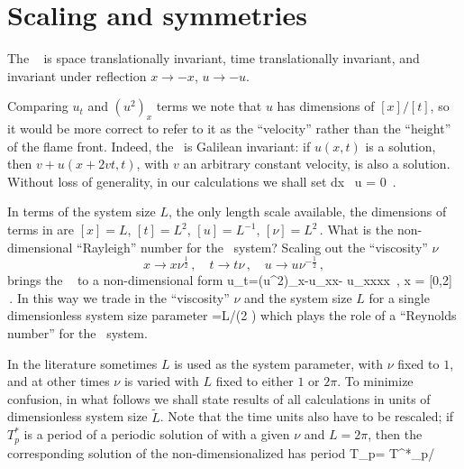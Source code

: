 %

\section{Scaling and symmetries}


The \KSe\  is space translationally invariant,
time translationally invariant, and invariant under
reflection
$x \to -x$, 
$u \to -u$. 

Comparing $u_t$ and $(u^2)_x$ terms we note that $u$ has
dimensions of $[x]/[t]$, so it would be more correct to
refer to it as the ``velocity'' rather than the 
``height'' of the flame front. Indeed, the  \KSe\ is
Galilean invariant: if $u(x,t)$ is a solution, then 
$v+u(x+2vt,t)$, with $v$ an arbitrary constant velocity, is also a solution. 
Without loss of generality, in our calculations we shall set 
\beq
\int dx \, u = 0
\,.

In terms of the system size $L$, the only length scale available,
the dimensions of terms in  are
$ %
[x]=L
$, $%
[t]=L^2
$, $%
[u]=L^{-1}
$, $%
[\nu]=L^2
\,.
$ %
What is the non-dimensional ``Rayleigh'' number for the
\KS\ system? 
 Scaling out the ``viscosity'' $\nu$ 
\[ 
x \to x \nu^{\frac{1}{2}}
\,,\quad
t \to t \nu
\,,\quad
u \to u \nu^{-\frac{1}{2}}
\,,
\]
brings the \KSe\ 
to a non-dimensional form
\beq
u_t=(u^2)_x-u_{xx}- u_{xxxx}
\,,\qquad	
	x \in  [0,L\nu^{-\frac{1}{2}}] = [0,2\pi{}]
\,.
In this way we trade in the ``viscosity'' $\nu$
and the system size $L$ for a single
dimensionless system size parameter
\beq
	={L}/{(2 \pi \sqrt{\nu})}
which plays the role of a ``Reynolds number''
for the \KS\ system.

In the literature sometimes 
$L$ is used as the system parameter, with $\nu$ fixed to $1$, and
at other times $\nu$ is varied with $L$ fixed to either $1$ or $2\pi$.
To minimize confusion,
in what follows we shall state results of all 
calculations in units of dimensionless system size $\tilde{L}$.
Note that the time units also have to be
rescaled; if $T^*_p$ is a period
of a periodic solution of  with a given
$\nu$ and $L=2\pi$, then
the corresponding solution of the non-dimensionalized 
has period 
\beq
 T_p= T^*_p/\nu
{}




